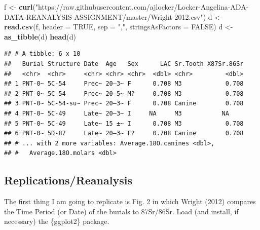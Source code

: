 \documentclass[]{article}
\newenvironment{Shaded}{\begin{snugshade}}{\end{snugshade}}
\newcommand{\KeywordTok}[1]{\textcolor[rgb]{0.13,0.29,0.53}{\textbf{#1}}}
\newcommand{\DataTypeTok}[1]{\textcolor[rgb]{0.13,0.29,0.53}{#1}}
\newcommand{\StringTok}[1]{\textcolor[rgb]{0.31,0.60,0.02}{#1}}
\newcommand{\OtherTok}[1]{\textcolor[rgb]{0.56,0.35,0.01}{#1}}
\newcommand{\NormalTok}[1]{#1}
\begin{document}
\begin{Shaded}
\begin{Highlighting}[]
\NormalTok{f <-}\StringTok{ }\KeywordTok{curl}\NormalTok{(}\StringTok{"https://raw.githubusercontent.com/ajlocker/Locker-Angelina-ADA-DATA-REANALYSIS-ASSIGNMENT/master/Wright-2012.csv"}\NormalTok{)}
\NormalTok{d <-}\StringTok{ }\KeywordTok{read.csv}\NormalTok{(f, }\DataTypeTok{header =} \OtherTok{TRUE}\NormalTok{, }\DataTypeTok{sep =} \StringTok{","}\NormalTok{, }\DataTypeTok{stringsAsFactors =} \OtherTok{FALSE}\NormalTok{)}
\NormalTok{d <-}\StringTok{ }\KeywordTok{as_tibble}\NormalTok{(d)  }
\KeywordTok{head}\NormalTok{(d)}
\end{Highlighting}
\end{Shaded}

\begin{verbatim}
## # A tibble: 6 x 10
##   Burial Structure Date  Age   Sex      LAC Sr.Tooth X87Sr.86Sr
##   <chr>  <chr>     <chr> <chr> <chr>  <dbl> <chr>         <dbl>
## 1 PNT-0~ 5C-54     Prec~ 20–3~ F      0.708 M3            0.708
## 2 PNT-0~ 5C-54     Prec~ 20–5~ M?     0.708 M3            0.708
## 3 PNT-0~ 5C-54-su~ Prec~ 20–3~ F      0.708 Canine        0.708
## 4 PNT-0~ 5C-49     Late~ 20–3~ I     NA     M3           NA    
## 5 PNT-0~ 5C-49     Late~ 15 ±~ I      0.708 M3            0.708
## 6 PNT-0~ 5D-87     Late~ 20–3~ F?     0.708 Canine        0.708
## # ... with 2 more variables: Average.18O.canines <dbl>,
## #   Average.18O.molars <dbl>
\end{verbatim}

\subsection{Replications/Reanalysis}\label{replicationsreanalysis}

The first thing I am going to replicate is Fig. 2 in which Wright (2012)
compares the Time Period (or Date) of the burials to 87Sr/86Sr. Load
(and install, if necessary) the \{ggplot2\} package.
\end{document}
